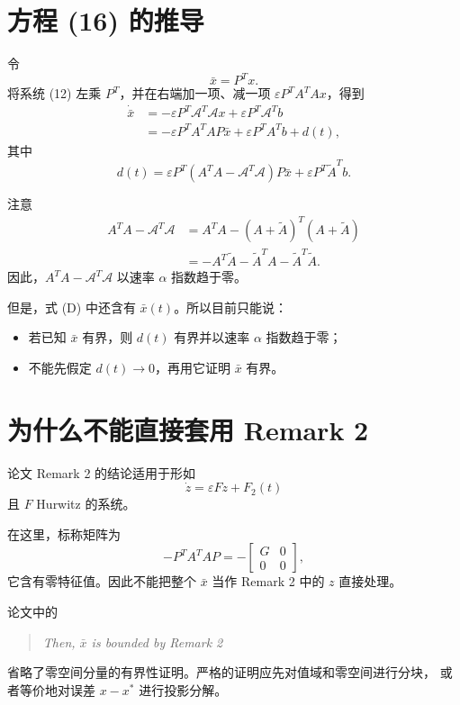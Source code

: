 \documentclass[UTF8,fontset=fandol]{ctexart}
\begin{document}
\section{方程 (16) 的推导}

令
\[
\bar{x}=P^{T}x.
\]
将系统 (12) 左乘 $P^{T}$，并在右端加一项、减一项
$\varepsilon P^{T}A^{T}Ax$，得到
\begin{equation}
\begin{aligned}
\dot{\bar{x}}
&=-\varepsilon P^{T}\mathcal{A}^{T}\mathcal{A}x
  +\varepsilon P^{T}\mathcal{A}^{T}b\\
&=-\varepsilon P^{T}A^{T}AP\bar{x}
  +\varepsilon P^{T}A^{T}b+d(t),
\end{aligned}
\tag{16}
\end{equation}
其中
\begin{equation}
d(t)
=\varepsilon P^{T}(A^{T}A-\mathcal{A}^{T}\mathcal{A})P\bar{x}
 +\varepsilon P^{T}\tilde{A}^{T}b.
\tag{D}
\end{equation}

注意
\[
\begin{aligned}
A^{T}A-\mathcal{A}^{T}\mathcal{A}
&=A^{T}A-(A+\tilde{A})^{T}(A+\tilde{A})\\
&=-A^{T}\tilde{A}-\tilde{A}^{T}A-\tilde{A}^{T}\tilde{A}.
\end{aligned}
\]
因此，$A^{T}A-\mathcal{A}^{T}\mathcal{A}$ 以速率 $\alpha$ 指数趋于零。

但是，式 (D) 中还含有 $\bar{x}(t)$。所以目前只能说：
\begin{itemize}
  \item 若已知 $\bar{x}$ 有界，则 $d(t)$ 有界并以速率 $\alpha$ 指数趋于零；
  \item 不能先假定 $d(t)\to0$，再用它证明 $\bar{x}$ 有界。
\end{itemize}

\section{为什么不能直接套用 Remark 2}

论文 Remark 2 的结论适用于形如
\[
\dot{z}=\varepsilon Fz+F_2(t)
\]
且 $F$ Hurwitz 的系统。

在这里，标称矩阵为
\[
-P^{T}A^{T}AP
=-
\begin{bmatrix}
G&0\\
0&0
\end{bmatrix},
\]
它含有零特征值。因此不能把整个 $\bar{x}$ 当作 Remark 2 中的 $z$ 直接处理。

论文中的
\begin{quote}
\emph{Then, $\bar{x}$ is bounded by Remark 2}
\end{quote}
省略了零空间分量的有界性证明。严格的证明应先对值域和零空间进行分块，
或者等价地对误差 $x-x^*$ 进行投影分解。
\end{document}
